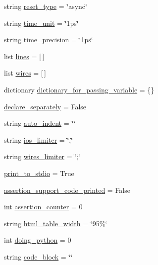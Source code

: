 \begin{DoxyCompactItemize}
\item 
string \hyperlink{namespaceverilog__generator_abb9b1a5f31f594c7d5f7e5ed5109b5ae}{reset\-\_\-type} = \char`\"{}async\char`\"{}
\item 
string \hyperlink{namespaceverilog__generator_adf7c6221b08ab4fb64b0982313fd0ff7}{time\-\_\-unit} = \char`\"{}1ps\char`\"{}
\item 
string \hyperlink{namespaceverilog__generator_abf2ac36940267286c7a5391623e03573}{time\-\_\-precision} = \char`\"{}1ps\char`\"{}
\item 
list \hyperlink{namespaceverilog__generator_a4116ec2b4ca55baef938c192cb786b9f}{lines} = \mbox{[}$\,$\mbox{]}
\item 
list \hyperlink{namespaceverilog__generator_aa5e203affef1ef3d1663ff2b55d94e66}{wires} = \mbox{[}$\,$\mbox{]}
\item 
dictionary \hyperlink{namespaceverilog__generator_a3013d1cc593da9b9bf0d2070d1efa32b}{dictionary\-\_\-for\-\_\-passing\-\_\-variable} = \{\}
\item 
\hyperlink{namespaceverilog__generator_ab6109161297a91e88d4900fd43a8ae7c}{declare\-\_\-separately} = False
\item 
string \hyperlink{namespaceverilog__generator_a6dc0cb849be3aeecb483610528ce0a8c}{auto\-\_\-indent} = \char`\"{}\char`\"{}
\item 
string \hyperlink{namespaceverilog__generator_add157c9592135f760a25b6882b66f317}{ios\-\_\-limiter} = \char`\"{},\char`\"{}
\item 
string \hyperlink{namespaceverilog__generator_a4b2325db94182cdaabe6764d7dd66e83}{wires\-\_\-limiter} = \char`\"{};\char`\"{}
\item 
\hyperlink{namespaceverilog__generator_ae2b00ab6926aace302d17acbfc4b4930}{print\-\_\-to\-\_\-stdio} = True
\item 
\hyperlink{namespaceverilog__generator_a0b5af5f0a450d4472bada6b8dc7f1476}{assertion\-\_\-support\-\_\-code\-\_\-printed} = False
\item 
int \hyperlink{namespaceverilog__generator_a240aab9d20a84388dc27eb1f446b0767}{assertion\-\_\-counter} = 0
\item 
string \hyperlink{namespaceverilog__generator_a599ad76910e1a4ff51f628cc081c2318}{html\-\_\-table\-\_\-width} = \char`\"{}95\%\char`\"{}
\item 
int \hyperlink{namespaceverilog__generator_a0d06d215d8d94fd14381a66bf96fc683}{doing\-\_\-python} = 0
\item 
string \hyperlink{namespaceverilog__generator_ab5096d6e8e228909ba47c9a767073c07}{code\-\_\-block} = \char`\"{}\char`\"{}

\end{DoxyCompactItemize}
